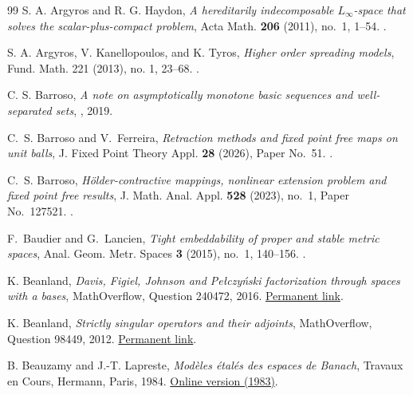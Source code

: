 \documentclass[11pt,reqno]{amsart}
\theoremstyle{plain}
\theoremstyle{definition}
\begin{document}
\begin{thebibliography}{99}
S. A. Argyros and R. G. Haydon,
\newblock \emph{A hereditarily indecomposable $L_\infty$-space that solves
the scalar-plus-compact problem},
\newblock Acta Math. \textbf{206} (2011), no.~1, 1--54.
\newblock {}.

S. A. Argyros, V. Kanellopoulos, and K. Tyros,
\newblock \emph{Higher order spreading models},
\newblock Fund. Math. 221 (2013), no. 1, 23--68.
\newblock {}.

C. S. Barroso,
\newblock \emph{A note on asymptotically monotone basic sequences and well-separated sets},
\newblock {}, 2019.

C.~S. Barroso and V.~Ferreira,
\newblock \emph{Retraction methods and fixed point free maps on unit balls},
\newblock J. Fixed Point Theory Appl. \textbf{28} (2026),
Paper No.~51.
\newblock {}.

C.~S. Barroso,
\newblock \emph{H\"older-contractive mappings, nonlinear extension problem and fixed point free results},
\newblock J. Math. Anal. Appl. \textbf{528} (2023), no.~1,
Paper No.~127521.
\newblock {}.

F.~Baudier and G.~Lancien,
\newblock \emph{Tight embeddability of proper and stable metric spaces},
\newblock Anal. Geom. Metr. Spaces \textbf{3} (2015), no.~1, 140--156.
\newblock {}.

K. Beanland,
\newblock \emph{Davis, Figiel, Johnson and Pe{\l}czy\'nski factorization through spaces with a bases},
\newblock MathOverflow, Question 240472, 2016.
\newblock \href{https://mathoverflow.net/q/240472}{Permanent link}.

K. Beanland,
\newblock \emph{Strictly singular operators and their adjoints},
\newblock MathOverflow, Question 98449, 2012.
\newblock \href{https://mathoverflow.net/questions/98449/strictly-singular-operators-and-their-adjoints}{Permanent link}.

B. Beauzamy and J.-T. Lapreste,
\newblock \emph{Mod\`eles \'etal\'es des espaces de Banach},
\newblock Travaux en Cours, Hermann, Paris, 1984.
\newblock \href{https://www.numdam.org/item/PDML_1983___4A_A1_0/}{Online version (1983)}.


\end{thebibliography}
\end{document}
